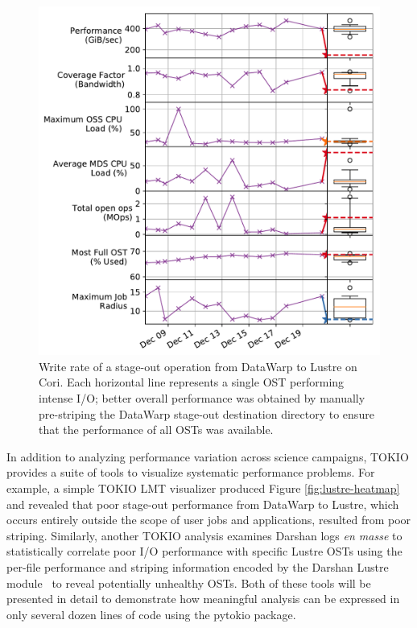 \begin{figure}[t]
    \centering
    \includegraphics[width=1.0\columnwidth]{umami}
    \vspace{-.3in}
    \caption{Write rate of a stage-out operation from DataWarp to Lustre on Cori.  Each horizontal line represents a single OST performing intense I/O; better overall performance was obtained by manually pre-striping the DataWarp stage-out destination directory to ensure that the performance of all OSTs was available.}
    \label{fig:umami}
    \vspace{-.2in}
\end{figure}

In addition to analyzing performance variation across science campaigns, TOKIO provides a suite of tools to visualize systematic performance problems.  For example, a simple TOKIO LMT visualizer produced Figure \ref{fig:lustre-heatmap} and revealed that poor stage-out performance from DataWarp to Lustre, which occurs entirely outside the scope of user jobs and applications, resulted from poor striping.  Similarly, another TOKIO analysis examines Darshan logs \emph{en masse} to statistically correlate poor I/O performance with specific Lustre OSTs using the per-file performance and striping information encoded by the Darshan Lustre module~\cite{Snyder2016modular} to reveal potentially unhealthy OSTs.  Both of these tools will be presented in detail to demonstrate how meaningful analysis can be expressed in only several dozen lines of code using the pytokio package.

